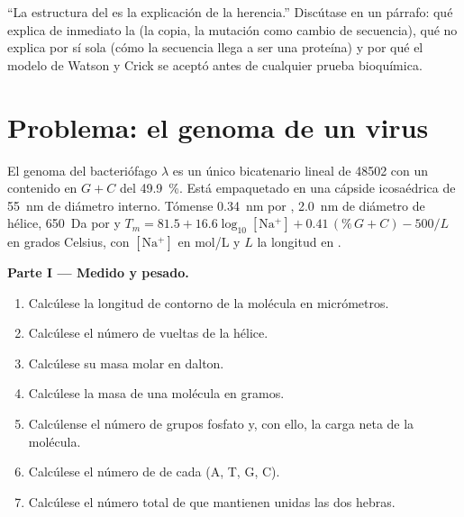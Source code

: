 \begin{exercise}[$\star\star\star$]\label{exo:b1:nucleic-acids:12}
``La estructura del  es la explicación de la herencia.'' Discútase en un
párrafo: qué explica de inmediato la  (la copia, la mutación
como cambio de secuencia), qué no explica por sí sola (cómo la secuencia
llega a ser una proteína) y por qué el modelo de Watson y Crick se aceptó
antes de cualquier prueba bioquímica.
\end{exercise}

\section{Problema: el genoma de un virus}

\begin{problem}
\label{pb:b1:nucleic-acids:1}
El genoma del bacteriófago $\lambda$ es un único  bicatenario lineal de
\num{48502}  con un contenido en $G + C$ del \qty{49.9}{\%}.
Está empaquetado en una cápside icosaédrica de \qty{55}{nm} de diámetro
interno. Tómense \qty{0.34}{nm} por , \qty{2.0}{nm} de diámetro
de hélice, \qty{650}{Da} por  y $T_m = 81.5 + 16.6\log_{10}[\mathrm{Na^+}]
+ 0.41\,(\%\,G{+}C) - 500/L$ en grados Celsius, con $[\mathrm{Na^+}]$ en
\unit{mol/L} y $L$ la longitud en .

\medskip
\noindent\textbf{Parte I --- Medido y pesado.}
\begin{enumerate}
  \item Calcúlese la longitud de contorno de la molécula en micrómetros.
  \item Calcúlese el número de vueltas de la hélice.
  \item Calcúlese su masa molar en dalton.
  \item Calcúlese la masa de una molécula en gramos.
  \item Calcúlense el número de grupos fosfato y, con ello, la carga neta
        de la molécula.
  \item Calcúlese el número de  de cada  (A, T, G, C).
  \item Calcúlese el número total de  que mantienen
        unidas las dos hebras.
\end{enumerate}


\end{problem}
